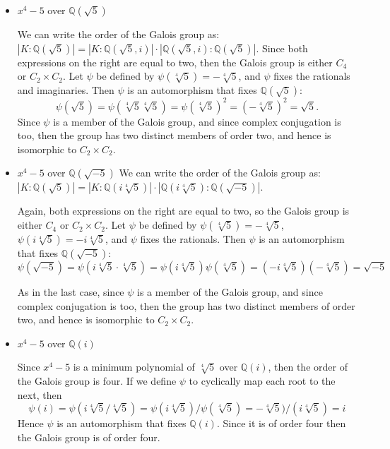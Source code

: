 \documentclass[11pt]{article} \usepackage{amssymb}
\newcommand{\Q}{\mathbb Q}
\begin{document}
\begin{enumerate}
\begin{itemize}
    \item $x^4-5$ over $\Q(\sqrt{5})$
      
      We can write the order of the Galois group as:
      $|K:\Q(\sqrt{5})|=|K:\Q(\sqrt{5},i)|\cdot|\Q(\sqrt{5},i):\Q(\sqrt{5})|$.
      Since both expressions on the right are equal to two, then the Galois
      group is either $C_4$ or $C_2\times C_2$. Let $\psi$ be defined by 
      $\psi(\sqrt[4]{5})=-\sqrt[4]{5}$, and $\psi$ fixes the rationals and imaginaries. 
      Then $\psi$ is an automorphism that
      fixes $\Q(\sqrt{5})$:
      \begin{equation*}
        \psi(\sqrt{5})=\psi(\sqrt[4]{5}\sqrt[4]{5})=\psi(\sqrt[4]{5})^2
        = (-\sqrt[4]{5})^2=\sqrt{5}.
      \end{equation*}
      Since $\psi$ is a member of the Galois group, and since complex 
      conjugation is too, then the group has two distinct members of order
      two, and hence is isomorphic to $C_2\times C_2$.

    \item $x^4-5$ over $\Q(\sqrt{-5})$
      We can write the order of the Galois group as:
      $|K:\Q(\sqrt{5})|=|K:\Q(i\sqrt[4]{5})|\cdot|\Q(i\sqrt[4]{5}):\Q(\sqrt{-5})|$.
      
      Again, both expressions on the right are equal to two, so the Galois
      group is either $C_4$ or $C_2\times C_2$. Let $\psi$ be defined by 
      $\psi(\sqrt[4]{5})=-\sqrt[4]{5}$, $\psi(i\sqrt[4]{5})=-i\sqrt[4]{5}$,
      and $\psi$ fixes the rationals. Then $\psi$ is an automorphism that
      fixes $\Q(\sqrt{-5})$:
      \begin{equation*}
        \psi(\sqrt{-5})=\psi(i\sqrt[4]{5}\cdot\sqrt[4]{5})
        = \psi(i\sqrt[4]{5})\psi(\sqrt[4]{5})
        = (-i\sqrt[4]{5})(-\sqrt[4]{5})=\sqrt{-5}
      \end{equation*}
      
      As in the last case, since $\psi$ is a member of the Galois group, and 
      since complex 
      conjugation is too, then the group has two distinct members of order
      two, and hence is isomorphic to $C_2\times C_2$.
      
    \item $x^4-5$ over $\Q(i)$

      Since $x^4-5$ is a minimum polynomial of $\sqrt[4]{5}$ over $\Q(i)$, then 
      the order of the Galois group is four.
      If we define $\psi$ to cyclically map each root to the next, then
      \begin{equation*}
        \psi(i)=\psi(i\sqrt[4]{5}/\sqrt[4]{5})
        =\psi(i\sqrt[4]{5})/\psi(\sqrt[4]{5})
        =-\sqrt[4]{5})/(i\sqrt[4]{5})
        =i
      \end{equation*}
      Hence $\psi$ is an automorphism that fixes $\Q(i)$. Since it is of order
      four then the Galois group is of order four.


\end{itemize}
\end{enumerate}
\end{document}
